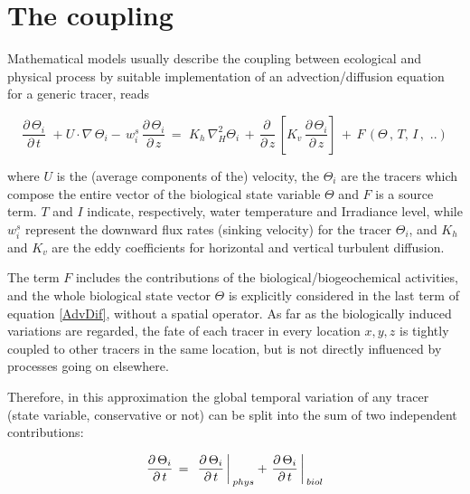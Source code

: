 


\section{The coupling}


Mathematical models usually describe the coupling between ecological 
and physical process by suitable implementation of an advection/diffusion 
equation for a generic tracer, reads 

\begin{equation} \label{AdvDif}
\frac{\partial \,\Theta _{i} }{\partial \,t} \,\,+U\cdot \nabla \,\Theta
_{i} -\,w^{s}_{i} \,\frac{\partial \,\Theta _{i} }{\partial \,z} \,=\,\,K_{h}
\,\nabla _{H}^{2} \Theta _{i} \,+\,\frac{\partial \,}{\partial \,z}
\,\left[ K_{v} \,\frac{\partial \,\Theta _{i} }{\partial \,z} \right]
\,+\,F\,\left( \Theta \,,\,T,\,I\,,\,\,..\right)
\end{equation}

where $U$ is the (average components of the) velocity, 
the $\Theta_{i}$ are the tracers which compose the entire 
vector of the biological state variable $\Theta$ and 
$F$ is a source term. $T$ and $I$ indicate, respectively, 
water temperature and Irradiance level, while $w^{s}_{i}$ represent 
the downward flux rates (sinking velocity) for the tracer 
$\Theta_{i}$, 
and $K_{h}$ and $K_{v}$ are the eddy coefficients for 
horizontal and vertical turbulent diffusion.

The term $F$ includes the contributions of the biological/biogeochemical 
activities, and the whole biological state vector $\Theta$ 
is explicitly considered in the last term of equation \ref{AdvDif}, without 
a spatial operator. As far as the biologically induced variations 
are regarded, the fate of each tracer in every location $x,y,z$ 
is tightly coupled to other tracers in the same location, but 
is not directly influenced by processes going on elsewhere. 

Therefore, in this approximation the global temporal variation 
of any tracer (state variable, conservative or not) can be split 
into the sum of two independent contributions: 

\begin{equation}
\frac{\partial \,\Theta _{i} }{\partial \,t} \,=\,\,\left. \frac{\partial
\,\Theta _{i} }{\partial \,t} \right\arrowvert_{phys} +\left. \frac{\partial
\,\Theta _{i} }{\partial \,t} \right\arrowvert_{biol}
\end{equation}


